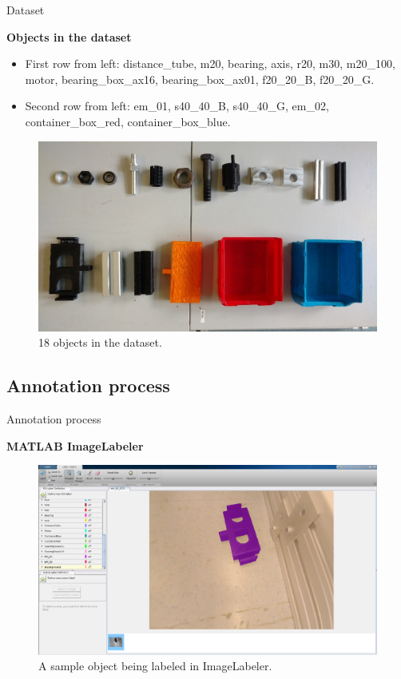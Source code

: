 \documentclass{beamer}
\begin{document}
\begin{frame}{Dataset}
	
	\textbf{Objects in the dataset}
	\begin{small}
		\begin{itemize}
			\item First row from left: distance\_tube, m20, bearing, axis, r20, m30, m20\_100, motor, bearing\_box\_ax16, bearing\_box\_ax01, f20\_20\_B, f20\_20\_G. 
			\item Second row from left: em\_01, s40\_40\_B, s40\_40\_G, em\_02, container\_box\_red, container\_box\_blue.
		\end{itemize}
	\end{small}
	\begin{figure}[h]
		\centering
		\includegraphics[scale=0.2]{images/all_objects}
		\captionsetup{justification=centering,margin=0.2cm}
		\caption{18 objects in the dataset.}
		\label{Fig:allobjects}
	\end{figure}

\end{frame}

\subsection{Annotation process}

\begin{frame}{Annotation process}
	
	\textbf{MATLAB ImageLabeler}
	\begin{figure}[!htb]
		\centering
		\includegraphics[width=.8\linewidth]{images/imglabler_eg}
		\captionsetup{justification=centering,margin=0.2cm}
		\caption{A sample object being labeled in ImageLabeler.}
		\label{Fig:annotate}
	\end{figure}

\end{frame}
\end{document}
